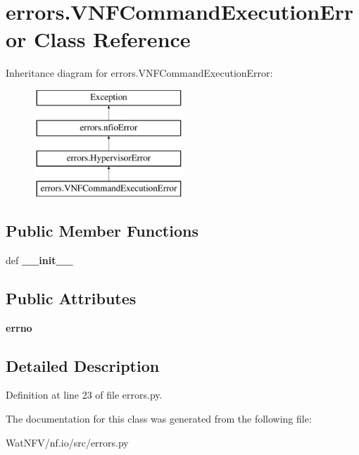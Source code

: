 \hypertarget{classerrors_1_1VNFCommandExecutionError}{\section{errors.\-V\-N\-F\-Command\-Execution\-Error Class Reference}
\label{classerrors_1_1VNFCommandExecutionError}
}
Inheritance diagram for errors.\-V\-N\-F\-Command\-Execution\-Error\-:\begin{figure}[H]
\begin{center}
\leavevmode
\includegraphics[height=4.000000cm]{classerrors_1_1VNFCommandExecutionError}
\end{center}
\end{figure}
\subsection*{Public Member Functions}
\begin{DoxyCompactItemize}
\item 
\hypertarget{classerrors_1_1VNFCommandExecutionError_af0c11e6123bad9731ea4a2f26a355386}{def {\bfseries \-\_\-\-\_\-init\-\_\-\-\_\-}}\label{classerrors_1_1VNFCommandExecutionError_af0c11e6123bad9731ea4a2f26a355386}

\end{DoxyCompactItemize}
\subsection*{Public Attributes}
\begin{DoxyCompactItemize}
\item 
\hypertarget{classerrors_1_1VNFCommandExecutionError_aaa61a3add5b9a67e6e6076b30d58d2ad}{{\bfseries errno}}\label{classerrors_1_1VNFCommandExecutionError_aaa61a3add5b9a67e6e6076b30d58d2ad}

\end{DoxyCompactItemize}


\subsection{Detailed Description}


Definition at line 23 of file errors.\-py.



The documentation for this class was generated from the following file\-:\begin{DoxyCompactItemize}
\item 
Wat\-N\-F\-V/nf.\-io/src/errors.\-py\end{DoxyCompactItemize}
